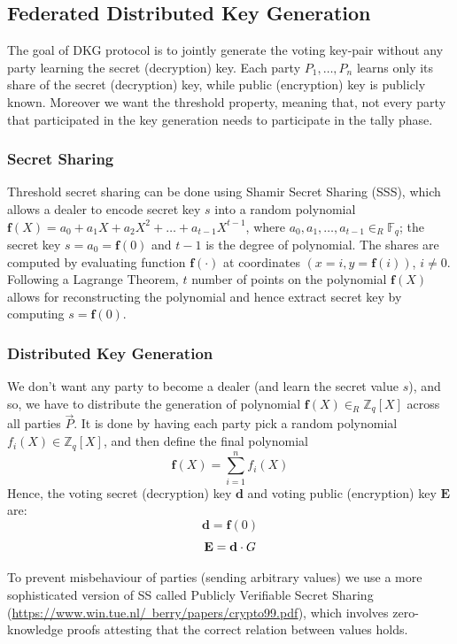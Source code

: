 \documentclass{article}
\begin{document}
\subsection{Federated Distributed Key Generation}
The goal of DKG protocol is to jointly generate the voting key-pair without any party learning the secret (decryption) key. Each party $P_1,\dots,P_n$ learns only its share of the secret (decryption) key, while public (encryption) key is publicly known. Moreover we want the threshold property, meaning that, not every party that participated in the key generation needs to participate in the tally phase.

\subsubsection*{Secret Sharing}

Threshold secret sharing can be done using Shamir Secret Sharing (SSS), which allows a dealer to encode secret key $s$ into a random polynomial $\mathbf{f}(X) = a_0 + a_1X + a_2X^2 + \dots + a_{t-1}X^{t-1}$, where $a_0,a_1,\dots,a_{t-1} \in_R \mathbb{F}_q$; the secret key $s=a_0=\mathbf{f}(0)$ and $t-1$ is the degree of polynomial. The shares are computed by evaluating function $\mathbf{f}(\cdot)$ at coordinates $(x=i,y=\mathbf{f}(i))$, $i \neq 0$. Following a Lagrange Theorem, $t$ number of points on the polynomial $\mathbf{f}(X)$ allows for reconstructing the polynomial and hence extract secret key by computing $s = \mathbf{f}(0)$.

\subsubsection*{Distributed Key Generation}
We don't want any party to become a dealer (and learn the secret value $s$), and so, we have to distribute the generation of polynomial $\mathbf{f}(X) \in_R \mathbb{Z}_q[X]$ across all parties $\vec{P}$. It is done by having each party pick a random polynomial $f_{i}(X) \in \mathbb{Z}_q[X]$, and then define the final polynomial \[\mathbf{f}(X)=\sum_{i=1}^{n}f_i(X)\] Hence, the voting secret (decryption) key $\mathbf{d}$ and voting public (encryption) key $\mathbf{E}$ are: $$\mathbf{d}=\mathbf{f}(0)$$ $$\mathbf{E}=\mathbf{d} \cdot G$$ 

To prevent misbehaviour of parties (sending arbitrary values) we use a more sophisticated version of SS called Publicly Verifiable Secret Sharing (\href{PVSS}{https://www.win.tue.nl/~berry/papers/crypto99.pdf}), which involves zero-knowledge proofs attesting that the correct relation between values holds.
\end{document}
